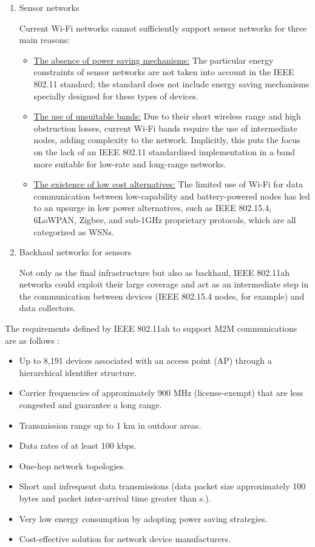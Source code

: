 \documentclass[]{article}
\begin{document}
\begin{enumerate}
\item Sensor networks
\par Current Wi-Fi networks cannot sufficiently support sensor networks for three main reasons:

\begin{itemize}
\item \underline{The absence of power saving mechanisms:} The particular energy constraints of sensor networks are not taken into account in the IEEE 802.11 standard; the standard does not include energy saving mechanisms specially designed for these types of devices.


\item \underline{The use of unsuitable bands:} Due to their short wireless range and high obstruction losses, current Wi-Fi bands require the use of intermediate nodes, adding complexity to the network. Implicitly, this puts the focus on the lack of an IEEE 802.11 standardized implementation in a band more suitable for low-rate and long-range networks.

\item \underline{The existence of low cost alternatives:} The limited use of Wi-Fi for data communication between low-capability and battery-powered nodes has led to an upsurge in low power alternatives, such as IEEE 802.15.4, 6LoWPAN, Zigbee, and sub-1GHz proprietary protocols, which are all categorized as WSNs.
\end{itemize}


\item Backhaul networks for sensors
\par Not only as the final infrastructure but also as backhaul, IEEE 802.11ah networks could exploit their large coverage and act as an intermediate step in the communication between devices (IEEE 802.15.4 nodes, for example) and data collectors.
\end{enumerate}

The requirements defined by IEEE 802.11ah to support M2M communications are as follows \cite{aust2012ieee,aust2012sub}:

\begin{itemize}
\item Up to 8,191 devices associated with an access point (AP) through a hierarchical identifier structure.
\item Carrier frequencies of approximately 900 MHz (license-exempt) that are less congested and guarantee a long range.
\item Transmission range up to 1 km in outdoor areas.
\item Data rates of at least 100 kbps.
\item One-hop network topologies.
\item Short and infrequent data transmissions (data packet size approximately 100 bytes and packet inter-arrival time greater than  s.).
\item Very low energy consumption by adopting power saving strategies.
\item Cost-effective solution for network device manufacturers.
\end{itemize}
\end{document}

